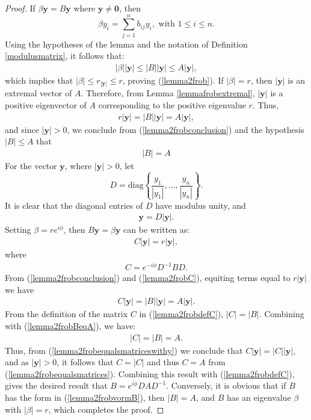 \documentclass[a4paper,11pt]{report}
\begin{document}
  
  \begin{proof}
  If $\beta\mathbf{y} = B\mathbf{y}$ where $\mathbf{y} \not = \mathbf{0}$, then
  $$\beta y_i = \sum_{j=1}^n b_{ij}y_i, \text{ with } 1 \leq i \leq n.$$
  Using the hypotheses of the lemma and the notation of Definition \ref{modulusmatrix}, it follows that:
  \begin{eqnarray}
|\beta||\mathbf{y}| \leq |B||\mathbf{y}| \leq A |\mathbf{y}|,
\end{eqnarray}
which implies that $|\beta| \leq r_{|\mathbf{y}|} \leq r$, proving 
(\ref{lemma2frob}). If $|\beta| = r$, then $|\mathbf{y}|$ is an extremal vector 
of $A$. Therefore, from Lemma \ref{lemmafrobextremal}, $|\mathbf{y}|$ is a 
positive eigenvector of $A$ corresponding to the positive eigenvalue $r$. Thus,
\begin{eqnarray}\label{lemma2frobconclusion}
  r|\mathbf{y}| = |B||\mathbf{y}| = A|\mathbf{y}|,
\end{eqnarray}
and since $|\mathbf{y}| > 0$, we conclude from (\ref{lemma2frobconclusion}) and 
the hypothesis $|B| \leq A$ that 
\begin{eqnarray}\label{lemma2frobBeqA}  |B| = A
  \end{eqnarray}
For the vector $\mathbf{y}$, where $|\mathbf{y}| > 0$, let
$$D = \text{diag}\left\{\frac{y_1}{|y_1|}, \ldots, \frac{y_n}{|y_n|}\right\}.$$
It is clear that the diagonal entries of $D$ have modulus unity, and
\begin{eqnarray}
  \mathbf{y} = D|\mathbf{y}|.
    \end{eqnarray}
Setting $\beta = re^{i\phi}$, then $B\mathbf{y} = \beta\mathbf{y}$ can be 
written as:
\begin{eqnarray}\label{lemma2frobC}
  C|\mathbf{y}| = r|\mathbf{y}|,
\end{eqnarray}
where
\begin{eqnarray}\label{lemma2frobdefC}
  C = e^{-i\phi}D^{-1}BD.
\end{eqnarray}
From (\ref{lemma2frobconclusion}) and (\ref{lemma2frobC}), equiting terms equal 
to $r|\mathbf{y}|$ we have
\begin{eqnarray}\label{lemma2frobequalsmatriceswithy}
 C|\mathbf{y}| = |B||\mathbf{y}| = A|\mathbf{y}|.
 \end{eqnarray}
 From the definition of the matrix $C$ in (\ref{lemma2frobdefC}), $|C| = |B|$. 
 Combining with (\ref{lemma2frobBeqA}), we have:
 \begin{eqnarray}\label{lemma2frobequalsmatrices}
 |C| = |B| = A.
 \end{eqnarray}
 Thus, from (\ref{lemma2frobequalsmatriceswithy}) we conclude that $C|\mathbf{y}| = 
 |C||\mathbf{y}|$, and as $|\mathbf{y}| > 0$, it follows that $C = |C|$ and thus $C = A$ from  
 (\ref{lemma2frobequalsmatrices}). Combining this result with 
 (\ref{lemma2frobdefC}), gives the desired result that $B = e^{i\phi}DAD^{-1}$. 
 Conversely, it is obvious that if $B$ has the form in (\ref{lemma2frobvormB}), 
 then $|B|=A$, and $B$ has an eigenvalue $\beta$ with $|\beta| = r$, which 
 completes the proof.
\end{proof}
\end{document}
